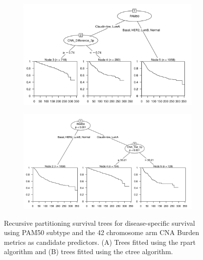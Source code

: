 \begin{figure}[!h]
\centering

\vspace{0.5cm}

\begin{subfigure}{\textwidth}
\subcaption{}
\includegraphics[width=1\textwidth]{../figures/Chapter_3/PA_PartyKit_Survival_Burden_DSS_PAM50.png}
\end{subfigure}

\vspace{2cm}

\begin{subfigure}{\textwidth}
\subcaption{}
\includegraphics[width=1\textwidth]{../figures/Chapter_3/PA_Ctree_Survival_Burden_DSS_PAM50.png}
\end{subfigure}

\vspace{0.5cm}

\caption[Recursive partitioning survival trees for disease-specific survival using PAM50 subtype and the 42 chromosome arm CNA Burden metrics as candidate predictors.]{Recursive partitioning survival trees for disease-specific survival using PAM50 subtype and the 42 chromosome arm CNA Burden metrics as candidate predictors. (A) Trees fitted using the rpart algorithm and (B) trees fitted using the ctree algorithm.}
\label{fig:PAM50_PA_CNA_Burden_DSS}
\end{figure}

